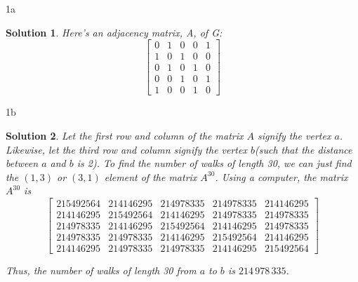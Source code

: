 \documentclass[boxes]{rutgers_hw}
\author{Rohan Karamel}
\date{\today}
\newtheorem*{solutions}{Solution}
\begin{document}
  \maketitle

  \begin{exern}{1a}
    
  \end{exern}
  \begin{solutions}
    Here's an adjacency matrix, A, of G\@:
    \[
      \begin{bmatrix}
        0 & 1 & 0 & 0 & 1 \\
        1 & 0 & 1 & 0 & 0 \\
        0 & 1 & 0 & 1 & 0 \\
        0 & 0 & 1 & 0 & 1 \\
        1 & 0 & 0 & 1 & 0
      \end{bmatrix} 
    \]
  \end{solutions}

  \begin{exern}{1b}

  \end{exern}
  \begin{solutions}
    Let the first row and column of the matrix $A$ signify the vertex $a$.
    Likewise, let the third row and column signify the vertex $b${(such that the distance between $a$ and $b$ is 2)}. 
    To find the number of walks of length 30, we can just find the $(1,3)$ or $(3,1)$ element of the matrix $A^{30}$.
    Using a computer, the matrix $A^{30}$ is
    \[
      \begin{bmatrix}
        215492564 & 214146295 & 214978335 & 214978335 & 214146295 \\
        214146295 & 215492564 & 214146295 & 214978335 & 214978335\\
        214978335 & 214146295 & 215492564 & 214146295 & 214978335 \\
        214978335 & 214978335 & 214146295 & 215492564 & 214146295 \\
        214146295 & 214978335 & 214978335 & 214146295 & 215492564
      \end{bmatrix}
    \]

    Thus, the number of walks of length 30 from $a$ to $b$ is $214\,978\,335$.
  \end{solutions}

  \pagebreak
\end{document}
